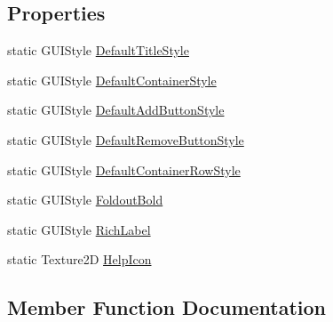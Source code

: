\subsection*{Properties}
\begin{DoxyCompactItemize}
\item 
static G\+U\+I\+Style \hyperlink{class_photon_g_u_i_a28c0ad75b52cffb47051b71c17bbd64c}{Default\+Title\+Style}
\item 
static G\+U\+I\+Style \hyperlink{class_photon_g_u_i_afd35b74087a0abaea7cc82ba27ca00fb}{Default\+Container\+Style}
\item 
static G\+U\+I\+Style \hyperlink{class_photon_g_u_i_a83d910edf7d73bc88d0f5ab02419b69a}{Default\+Add\+Button\+Style}
\item 
static G\+U\+I\+Style \hyperlink{class_photon_g_u_i_a4eed6f5e8cffecb56ee4baeef70d02c6}{Default\+Remove\+Button\+Style}
\item 
static G\+U\+I\+Style \hyperlink{class_photon_g_u_i_a7d49d3bec11154bdf80191c57eeeeea3}{Default\+Container\+Row\+Style}
\item 
static G\+U\+I\+Style \hyperlink{class_photon_g_u_i_adece5a484564c2a41da79f9a5240ae12}{Foldout\+Bold}
\item 
static G\+U\+I\+Style \hyperlink{class_photon_g_u_i_a41bd2b4e7b457cb4e0c64f07518c4d98}{Rich\+Label}
\item 
static Texture2D \hyperlink{class_photon_g_u_i_af415f8882256bb26872c10e95bdfae31}{Help\+Icon}
\end{DoxyCompactItemize}


\subsection{Member Function Documentation}
